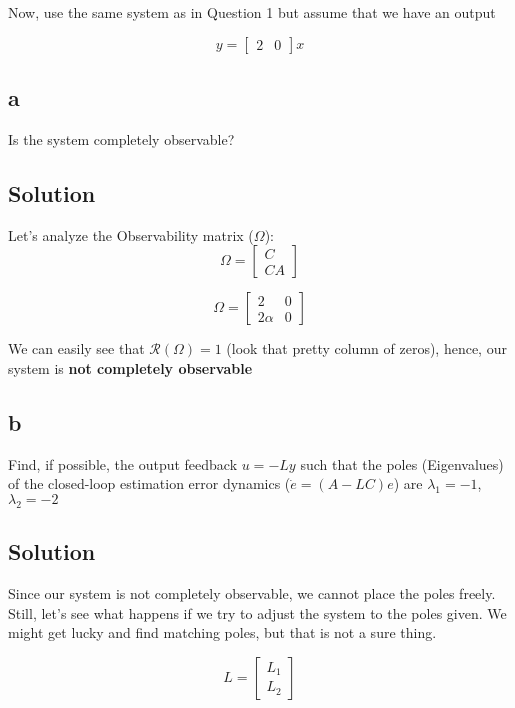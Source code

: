 \documentclass[10pt,a4paper]{article}
\begin{document}
\section{}
Now, use the same system as in Question 1 but assume that we have an output

\[ y = 
\begin{bmatrix}
2 & 0
\end{bmatrix}
x
\]

\subsection*{a}
Is the system completely observable?
\subsection*{Solution}
Let's analyze the Observability matrix ($\Omega$):
\[  
\Omega = 
\begin{bmatrix}
C \\ CA
\end{bmatrix}
\]

\[  
\Omega = 
\begin{bmatrix}
2 & 0 \\ 
2\alpha & 0
\end{bmatrix}
\]

We can easily see that $\mathcal{R}(\Omega) = 1$ (look that pretty column of zeros), hence, our system is \textbf{not completely observable}

\subsection*{b}
Find, if possible, the output feedback $u = -Ly$ such that the poles (Eigenvalues)  of the closed-loop estimation error dynamics ($\dot{e} = (A-LC)e$) are $\lambda_{1} = -1$, $\lambda_{2} = -2$

\subsection*{Solution}
Since our system is not completely observable, we cannot place the poles freely. Still, let's see what happens if we try to adjust the system to the poles given. We might get lucky and find matching poles, but that is not a sure thing.
\medskip

\[ L = 
\begin{bmatrix}
L_{1}\\
L_{2}
\end{bmatrix}
 \]
\end{document}
